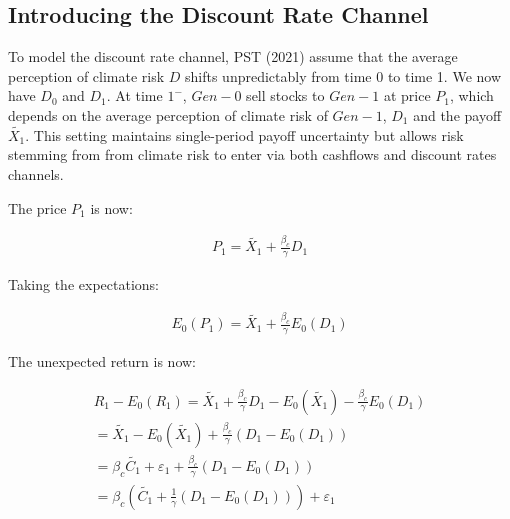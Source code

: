 \subsection{Introducing the Discount Rate Channel}

To model the discount rate channel, PST (2021)
assume that the average perception of climate risk 
$D$ shifts unpredictably from time 0 
to time 1. We now have $D_0$ and $D_1$.
At time $1^{-}$, $Gen-0$ sell stocks 
to $Gen-1$ at price $P_1$, which depends 
on the average perception of climate risk
of $Gen-1$, $D_1$ and the payoff $\tilde{X_1}$.
This setting maintains single-period 
payoff uncertainty but allows risk
stemming from from climate risk to enter 
via both cashflows and discount rates 
channels.

The price $P_1$ is now:

\begin{equation}
    \begin{aligned}
    P_1 = \tilde{X_1} + \frac{\beta_{c}}{\gamma}D_1
    \end{aligned}
\end{equation}

Taking the expectations:

\begin{equation}
    \begin{aligned}
    E_0(P_1) = \tilde{X_1} + \frac{\beta_{c}}{\gamma}E_0(D_1) 
    \end{aligned}
\end{equation}

The unexpected return is now:

\begin{equation}
    \begin{aligned}
    R_1 - E_0(R_1) = \tilde{X_1} + \frac{\beta_{c}}{\gamma}D_1 - E_0(\tilde{X_1}) - \frac{\beta_{c}}{\gamma}E_0(D_1) \\
    = \tilde{X_1} - E_0(\tilde{X_1}) + \frac{\beta_{c}}{\gamma}(D_1 - E_0(D_1)) \\
    = \beta_{c} \tilde{C_1} + \varepsilon_1 + \frac{\beta_{c}}{\gamma}(D_1 - E_0(D_1)) \\
    = \beta_{c}(\tilde{C_1} + \frac{1}{\gamma}(D_1 - E_0(D_1))) + \varepsilon_1
    \end{aligned}
\end{equation}

